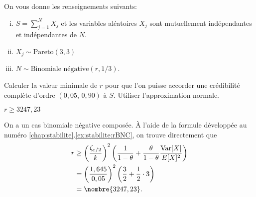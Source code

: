 \begin{exercice}
  On vous donne les renseignements suivants:
  \begin{enumerate}[(i)]
  \item $S = \sum_{j=1}^{N} X_j$ et les variables aléatoires
    $X_j$ sont mutuellement indépendantes et indépendantes de $N$.
  \item $X_j \sim \text{Pareto}(3, 3)$
  \item $N \sim \text{Binomiale négative}(r, 1/3)$.
  \end{enumerate}
  Calculer la valeur minimale de $r$ pour que l'on puisse accorder une
  crédibilité complète d'ordre $(0,05,\, 0,90)$ à $S$. Utiliser
  l'approximation normale.
  \begin{rep}
    $r \geq 3247,23$
  \end{rep}
  \begin{sol}
    On a un cas binomiale négative composée. À l'aide de la formule
    développée au numéro \ref{chap:stabilite}.\ref{ex:stabilite:rBNC},
    on trouve directement que
    \begin{align*}
      r
      &\geq
      \left(
        \frac{\zeta_{\varepsilon/2}}{k}
      \right)^2
      \left(
        \frac{1}{1 - \theta} +
        \frac{\theta}{1-\theta} \frac{\var{X}}{\esp{X}^2}
      \right) \\
      &=
      \left(
        \frac{1,645}{0,05}
      \right)^2
      \left(
        \frac{3}{2} + \frac{1}{2} \cdot 3
      \right) \\
      &= \nombre{3247,23}.
    \end{align*}
  \end{sol}
\end{exercice}


